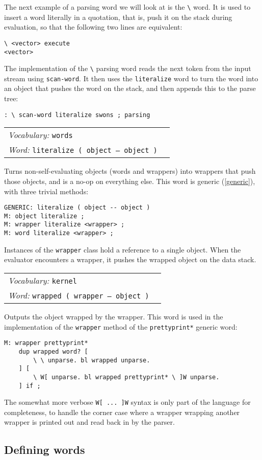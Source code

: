 \documentclass{book}
\newcommand{\vocabulary}[1]{\emph{Vocabulary:} \texttt{#1}&\\}
\newcommand{\ordinaryword}[2]{\index{\texttt{#1}}\emph{Word:} \texttt{#2}&\\}
\newcommand{\wordtable}[1]{


\begin{tabularx}{12cm}{lX}
\hline
#1
\hline
\end{tabularx}

}
\begin{document}
The next example of a parsing word we will look at is the \verb|\| word. It is used to insert a word literally in a quotation, that is, push it on the stack during evaluation, so that the following two lines are equivalent:
\begin{verbatim}
\ <vector> execute
<vector>
\end{verbatim}
The implementation of the \verb|\| parsing word reads the next token from the input stream using \verb|scan-word|.
It then uses the \verb|literalize| word to turn the word into an object that pushes the word
on the stack, and then appends this to the parse tree:
\begin{verbatim}
: \ scan-word literalize swons ; parsing
\end{verbatim}

\wordtable{
\vocabulary{words}
\ordinaryword{literalize}{literalize ( object -- object )}
}
Turns non-self-evaluating objects (words and wrappers) into wrappers that push those objects, and is a no-op on everything else. This word is generic (\ref{generic}), with three trivial methods:
\begin{verbatim}
GENERIC: literalize ( object -- object )
M: object literalize ;
M: wrapper literalize <wrapper> ;
M: word literalize <wrapper> ;
\end{verbatim}

\wrapglos

Instances of the \verb|wrapper| class hold a reference to a single object. When the evaluator encounters a wrapper, it pushes the wrapped object on the data stack.

\wordtable{
\vocabulary{kernel}
\ordinaryword{wrapped}{wrapped ( wrapper -- object )}
}
Outputs the object wrapped by the wrapper. This word is used in the implementation of the \verb|wrapper| method of the \verb|prettyprint*| generic word:
\begin{verbatim}
M: wrapper prettyprint* 
    dup wrapped word? [
        \ \ unparse. bl wrapped unparse. 
    ] [
        \ W[ unparse. bl wrapped prettyprint* \ ]W unparse. 
    ] if ;
\end{verbatim}
The somewhat more verbose \verb|W[ ... ]W| syntax is only part of the language for completeness, to handle the corner case where a wrapper wrapping another wrapper is printed out and read back in by the parser.

\subsection{Defining words}
\end{document}
